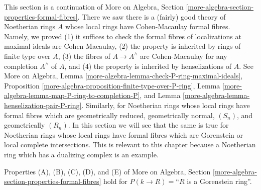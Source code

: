 \noindent
This section is a continuation of
More on Algebra, Section \ref{more-algebra-section-properties-formal-fibres}.
There we saw there is a (fairly) good theory of Noetherian rings $A$
whose local rings have Cohen-Macaulay formal fibres. Namely, we proved
(1) it suffices to check the formal fibres of localizations at
maximal ideals are Cohen-Macaulay,
(2) the property is inherited by rings of finite type over $A$,
(3) the fibres of $A \to A^\wedge$ are Cohen-Macaulay for
any completion $A^\wedge$ of $A$, and
(4) the property is inherited by henselizations of $A$. See
More on Algebra, Lemma \ref{more-algebra-lemma-check-P-ring-maximal-ideals},
Proposition \ref{more-algebra-proposition-finite-type-over-P-ring},
Lemma \ref{more-algebra-lemma-map-P-ring-to-completion-P}, and
Lemma \ref{more-algebra-lemma-henselization-pair-P-ring}.
Similarly, for Noetherian rings whose local rings have formal fibres
which are geometrically reduced, geometrically normal, $(S_n)$, and
geometrically $(R_n)$.
In this section we will see that the same is true for Noetherian rings
whose local rings have formal fibres which are Gorenstein
or local complete intersections.
This is relevant to this chapter because a Noetherian ring which has a
dualizing complex is an example.

\begin{lemma}
\label{lemma-formal-fibres-gorenstein}
Properties (A), (B), (C), (D), and (E) of
More on Algebra, Section \ref{more-algebra-section-properties-formal-fibres}
hold for $P(k \to R) =$``$R$ is a Gorenstein ring''.
\end{lemma}

